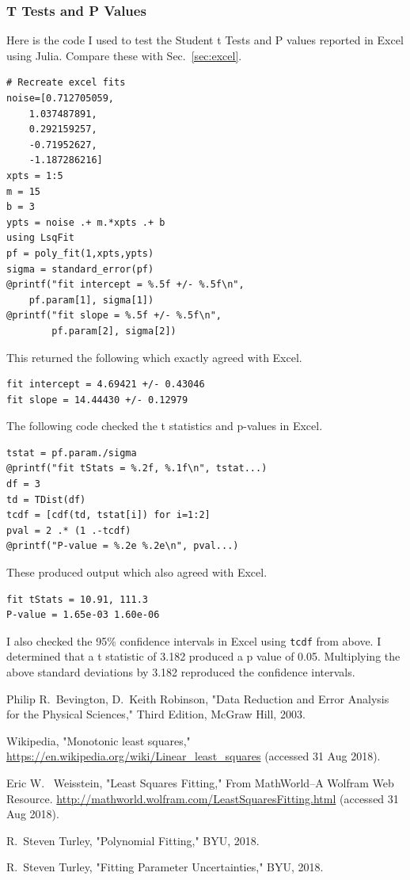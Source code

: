 \documentclass{scrartcl}
\begin{document}
\subsubsection{T Tests and P Values}
Here is the code I used to test the Student t Tests and P values
reported in Excel using Julia. Compare these with Sec.~\ref{sec:excel}.
\begin{lstlisting}
# Recreate excel fits
noise=[0.712705059,
    1.037487891,
    0.292159257,
    -0.71952627,
    -1.187286216]
xpts = 1:5
m = 15
b = 3
ypts = noise .+ m.*xpts .+ b
using LsqFit
pf = poly_fit(1,xpts,ypts)
sigma = standard_error(pf)
@printf("fit intercept = %.5f +/- %.5f\n",
    pf.param[1], sigma[1])
@printf("fit slope = %.5f +/- %.5f\n",
        pf.param[2], sigma[2])
\end{lstlisting}
This returned the following which exactly agreed with
Excel.
\begin{lstlisting}
fit intercept = 4.69421 +/- 0.43046
fit slope = 14.44430 +/- 0.12979
\end{lstlisting}
The following code checked the t statistics and
p-values in Excel.
\begin{lstlisting}
tstat = pf.param./sigma
@printf("fit tStats = %.2f, %.1f\n", tstat...)
df = 3
td = TDist(df)
tcdf = [cdf(td, tstat[i]) for i=1:2]
pval = 2 .* (1 .-tcdf)
@printf("P-value = %.2e %.2e\n", pval...)
\end{lstlisting}
These produced output which also agreed with Excel.
\begin{lstlisting}
fit tStats = 10.91, 111.3
P-value = 1.65e-03 1.60e-06
\end{lstlisting}
I also checked the 95\% confidence intervals in Excel
using \texttt{tcdf} from above. I determined that
a t statistic of 3.182 produced a p value of 0.05.
Multiplying the above standard deviations by
3.182 reproduced the confidence intervals.

\begin{thebibliography}{9}

Philip R.~Bevington, D.~Keith Robinson, 
"Data Reduction and Error Analysis for the Physical Sciences,"
Third Edition, McGraw Hill, 2003.

Wikipedia, "Monotonic least squares,"
\url{https://en.wikipedia.org/wiki/Linear_least_squares}
(accessed 31 Aug 2018).

Eric W.~ Weisstein, "Least Squares Fitting," From MathWorld--A Wolfram
Web Resource.
\url{http://mathworld.wolfram.com/LeastSquaresFitting.html}
(accessed 31 Aug 2018).

R.~Steven Turley, "Polynomial Fitting," BYU, 2018.

R.~Steven Turley, "Fitting Parameter Uncertainties," BYU, 2018.

\end{thebibliography}
\end{document}
